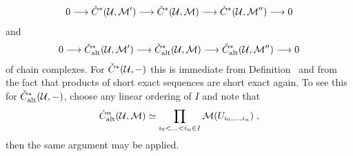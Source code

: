 \documentclass[a4paper,parskip=half,numbers=enddot, DIV=12]{scrreprt}
\begin{document}
\begin{align*}
	0\morphism \check{C}^*(\Uu,\Mm')\morphism \check{C}^*(\Uu,\Mm)\morphism \check{C}^*(\Uu,\Mm'')\morphism 0
\end{align*}
and
\begin{align*}
	0\morphism \check{C}_\alt^*(\Uu,\Mm')\morphism \check{C}_\alt^*(\Uu,\Mm)\morphism \check{C}_\alt^*(\Uu,\Mm'')\morphism 0
\end{align*}
of chain complexes. For $\check{C}^*(\mathcal{U},-)$ this is immediate from Definition~ and from the fact that products of short exact sequences are short exact again. To see this for $\check{C}_{\mathrm{alt}}^*(\mathcal{U},-)$, choose any linear ordering of $I$ and note that 
\begin{align*}
	\check{C}_{\mathrm{alt}}^n(\mathcal{U},\mathcal{M})\simeq\prod_{i_0<\ldots<i_n\in I}\mathcal{M}(U_{i_0,\ldots,i_n})\;,
\end{align*}
then the same argument may be applied.
\end{document}
